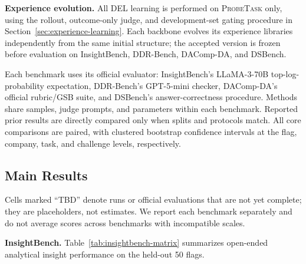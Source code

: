 \documentclass{article}
\newcommand{\probe}{\textsc{ProbeTask}}
\begin{document}
\noindent\textbf{Experience evolution.} All DEL learning is performed on \probe{} only, using the rollout, outcome-only judge, and development-set gating procedure in Section~\ref{sec:experience-learning}.
Each backbone evolves its experience libraries independently from the same initial structure; the accepted version is frozen before evaluation on InsightBench, DDR-Bench, DAComp-DA, and DSBench.

Each benchmark uses its official evaluator:
InsightBench's LLaMA-3-70B top-log-probability expectation, DDR-Bench's GPT-5-mini checker, DAComp-DA's official rubric/GSB suite, and DSBench's answer-correctness procedure.
Methods share samples, judge prompts, and parameters within each benchmark.
Reported prior results are directly compared only when splits and protocols match.
All core comparisons are paired, with clustered bootstrap confidence intervals at the flag, company, task, and challenge levels, respectively.

\subsection{Main Results}
\label{sec:main-results}

Cells marked ``TBD'' denote runs or official evaluations that are not yet complete; they are placeholders, not estimates.
We report each benchmark separately and do not average scores across benchmarks with incompatible scales.

\noindent\textbf{InsightBench.} Table~\ref{tab:insightbench-matrix} summarizes open-ended analytical insight performance on the held-out 50 flags.
\end{document}
